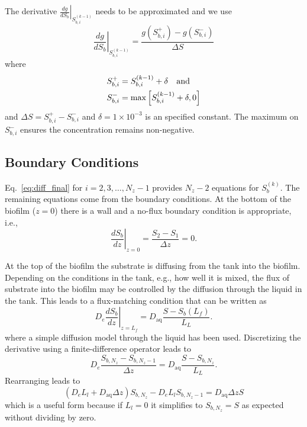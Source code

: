 \documentclass[letterpaper, twoside]{article}
\numberwithin{equation}{section}
\newcommand{\eg}{e.g.}
\newcommand{\ie}{i.e.}
\begin{document}
The derivative $\left.\frac{d g}{d S_b}\right|_{S_{b,i}^{(k-1)}}$ needs to be approximated and we use
\begin{equation}
  \label{eq:dgds}
  \left.\frac{d g}{d S_b}\right|_{S_{b,i}^{(k-1)}} = \frac{g\left(S_{b,i}^+\right) - g\left(S_{b,i}^{-}\right)}{\Delta S}
\end{equation}
where
\begin{align*}
  S_{b,i}^+&=S_{b,i}^{(k-1)}+\delta \text{\quad and} \\
  S_{b,i}^-&=\max\left[S_{b,i}^{(k-1)}+\delta,0\right]
\end{align*}
and $\Delta S = S_{b,i}^+ - S_{b,i}^-$ and $\delta=1\times 10^{-3}$ is an specified constant.  The maximum on $S_{b,i}^-$ ensures the concentration remains non-negative.

\subsection{Boundary Conditions} \label{Boundary Conditions}
Eq.~\ref{eq:diff_final} for $i=2,3,\dots,N_z-1$ provides $N_z-2$ equations for $S_{b}^{(k)}$.  The remaining equations come from the boundary conditions.  At the bottom of the biofilm ($z=0$) there is a wall and a no-flux boundary condition is appropriate, \ie,
\begin{equation}
  \label{eq:BC1}
  \left.\frac{d S_b}{dz}\right|_{z=0}= \frac{S_2 - S_1}{\Delta z} =0.
\end{equation}

At the top of the biofilm the substrate is diffusing from the tank into the biofilm.  Depending on the conditions in the tank, \eg, how well it is mixed, the flux of substrate into the biofilm may be controlled by the diffusion through the liquid in the tank.  This leads to a flux-matching condition that can be written as
\begin{equation}
  \label{eq:BC2}
  D_e \left.\frac{d S_b}{dz}\right|_{z=L_f} = D_{\mathrm{aq}} \frac{S - S_b(L_f)}{L_L}.
\end{equation}
where a simple diffusion model through the liquid has been used.  Discretizing the derivative using a finite-difference operator leads to
\begin{equation}
  \label{eq:BC2_dis}
  D_e \frac{S_{b,N_z} - S_{b,N_z-1}}{\Delta z} = D_{\mathrm{aq}} \frac{S - S_{b,N_z}}{L_L}.
\end{equation}
Rearranging leads to
\begin{equation}
  \label{eq:BC2_dis2}
  \left(D_e L_l + D_{\mathrm{aq}} \Delta z\right) S_{b,N_z} - D_e L_l S_{b,N_z-1} = D_{\mathrm{aq}} \Delta z S
\end{equation}
which is a useful form because if $L_l=0$ it simplifies to $S_{b,N_z}=S$ as expected without dividing by zero.
\end{document}
